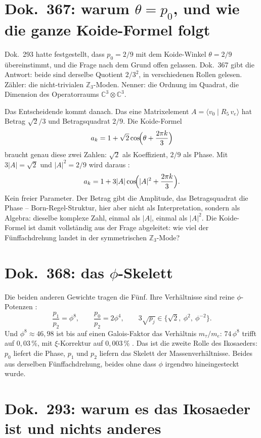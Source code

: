\section{Dok.~367: warum $\theta = p_0$, und wie die ganze Koide-Formel folgt}

Dok.~293 hatte festgestellt, dass $p_0 = 2/9$ mit dem Koide-Winkel $\theta = 2/9$
übereinstimmt, und die Frage nach dem Grund offen gelassen. Dok.~367 gibt die
Antwort: beide sind derselbe Quotient $2/3^2$, in verschiedenen Rollen gelesen.
Zähler: die nicht-trivialen $\mathbb{Z}_3$-Moden. Nenner: die Ordnung im
Quadrat, die Dimension des Operatorraums $\mathbb{C}^3\otimes\mathbb{C}^3$.

Das Entscheidende kommt danach. Das eine Matrixelement
$A = \langle v_0\mid R_5\,v_e\rangle$ hat Betrag $\sqrt2/3$ und Betragsquadrat
$2/9$. Die Koide-Formel
\[
  a_k = 1 + \sqrt2\cos\!\Bigl(\theta + \frac{2\pi k}{3}\Bigr)
\]
braucht genau diese zwei Zahlen: $\sqrt2$ als Koeffizient, $2/9$ als Phase. Mit
$3|A| = \sqrt2$ und $|A|^2 = 2/9$ wird daraus \BM:
\[
  a_k = 1 + 3|A|\cos\!\Bigl(|A|^2 + \frac{2\pi k}{3}\Bigr).
\]
Kein freier Parameter. Der Betrag gibt die Amplitude, das Betragsquadrat die
Phase -- Born-Regel-Struktur, hier aber nicht als Interpretation, sondern als
Algebra: dieselbe komplexe Zahl, einmal als $|A|$, einmal als $|A|^2$. Die
Koide-Formel ist damit vollständig aus der Frage abgeleitet: wie viel der
Fünffachdrehung landet in der symmetrischen $\mathbb{Z}_3$-Mode?

\section{Dok.~368: das $\phi$-Skelett}

Die beiden anderen Gewichte tragen die Fünf. Ihre Verhältnisse sind reine
$\phi$-Potenzen \BM:
\[
  \frac{p_1}{p_2} = \phi^8, \qquad \frac{p_0}{p_2} = 2\phi^4, \qquad
  3\sqrt{p_j} \in \{\sqrt2,\ \phi^2,\ \phi^{-2}\}.
\]
Und $\phi^8 \approx 46{,}98$ ist bis auf einen Galois-Faktor das Verhältnis
$m_\tau/m_e$: $74\,\phi^8$ trifft auf $0{,}03\,\%$, mit $\xi$-Korrektur auf
$0{,}003\,\%$ \KM. Das ist die zweite Rolle des Ikosaeders: $p_0$ liefert die
Phase, $p_1$ und $p_2$ liefern das Skelett der Massenverhältnisse. Beides aus
derselben Fünffachdrehung, beides ohne dass $\phi$ irgendwo hineingesteckt wurde.

\section{Dok.~293: warum es das Ikosaeder ist und nichts anderes}

